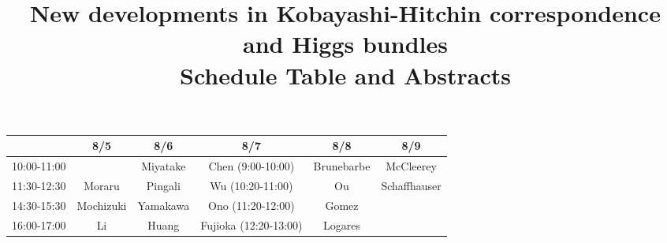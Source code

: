 \documentclass{article}
\begin{document}
\title{New developments in Kobayashi-Hitchin correspondence and Higgs bundles \\
\medskip
Schedule Table and Abstracts}
\date{}
\maketitle

\begin{table}[htbp]
\begin{center}
\begin{tabular}{cccccc} \hline \hline
&8/5 &8/6 &8/7 &8/8 &8/9 \\ \hline
10:00-11:00&& Miyatake&Chen (9:00-10:00)&Brunebarbe&McCleerey\\ \hline
11:30-12:30&Moraru& Pingali&Wu (10:20-11:00) &Ou&Schaffhauser\\ \hline
14:30-15:30 &Mochizuki & Yamakawa &Ono (11:20-12:00)&Gomez \\ \hline
16:00-17:00  &Li & Huang &Fujioka (12:20-13:00)& Logares\\ \hline\hline
\end{tabular}
\end{center}
\end{table}
\end{document}
